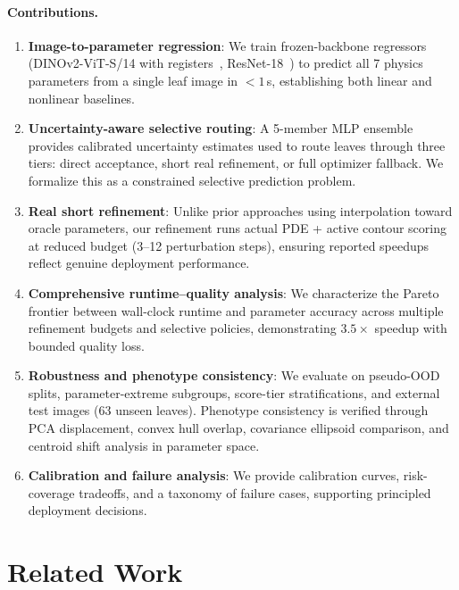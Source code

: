 \documentclass[11pt,a4paper]{article}
\begin{document}
\paragraph{Contributions.}
\begin{enumerate}[leftmargin=*,itemsep=2pt]
\item \textbf{Image-to-parameter regression}: We train frozen-backbone regressors
  (DINOv2-ViT-S/14 with registers~\cite{oquab2024dinov2,darcet2024vision},
  ResNet-18~\cite{he2016deep}) to predict all 7 physics parameters from a single
  leaf image in $<1$\,s, establishing both linear and nonlinear baselines.

\item \textbf{Uncertainty-aware selective routing}: A 5-member MLP ensemble provides
  calibrated uncertainty estimates used to route leaves through three tiers:
  direct acceptance, short real refinement, or full optimizer fallback.
  We formalize this as a constrained selective prediction problem.

\item \textbf{Real short refinement}: Unlike prior approaches using interpolation
  toward oracle parameters, our refinement runs actual PDE + active contour scoring
  at reduced budget (3--12 perturbation steps), ensuring reported speedups
  reflect genuine deployment performance.

\item \textbf{Comprehensive runtime--quality analysis}: We characterize the
  Pareto frontier between wall-clock runtime and parameter accuracy across
  multiple refinement budgets and selective policies, demonstrating
  $3.5\times$ speedup with bounded quality loss.

\item \textbf{Robustness and phenotype consistency}: We evaluate on
  pseudo-OOD splits, parameter-extreme subgroups, score-tier stratifications,
  and external test images (63 unseen leaves). Phenotype consistency is verified
  through PCA displacement, convex hull overlap, covariance ellipsoid comparison,
  and centroid shift analysis in parameter space.

\item \textbf{Calibration and failure analysis}: We provide calibration curves,
  risk-coverage tradeoffs, and a taxonomy of failure cases, supporting
  principled deployment decisions.
\end{enumerate}

\section{Related Work}
\label{sec:related}
\end{document}

